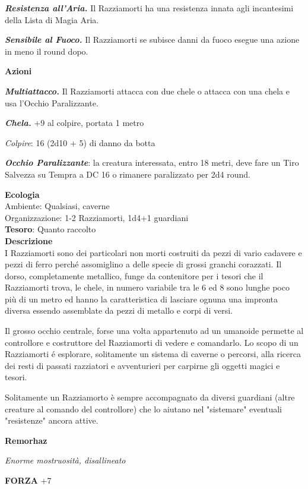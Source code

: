 \begin{multicols}{2}
	\textit{\textbf{Resistenza all'Aria.}} Il Razziamorti ha una resistenza innata agli incantesimi della Lista di Magia Aria.

	\textit{\textbf{Sensibile al Fuoco.}} Il Razziamorti se subisce danni da fuoco esegue una azione in meno il round dopo.

	\textbf{Azioni}

	\textit{\textbf{Multiattacco.}} Il Razziamorti attacca con due chele o attacca con una chela e usa l'Occhio Paralizzante.

	\textbf{\textit{Chela.}} +9 al colpire, portata 1 metro

	\textit{Colpire}: 16 (2d10 + 5) di danno da botta

	\textit{\textbf{Occhio Paralizzante}}: la creatura interessata, entro 18 metri, deve fare un Tiro Salvezza su Tempra a DC 16 o rimanere paralizzato per 2d4 round.

	\textbf{Ecologia}\\
	Ambiente: Qualsiasi, caverne\\
	Organizzazione: 1-2 Razziamorti, 1d4+1 guardiani\\
	\textbf{Tesoro}: Quanto raccolto\\
	\textbf{Descrizione}\\
	I Razziamorti sono dei particolari non morti costruiti da pezzi di vario cadavere e pezzi di ferro perché assomiglino a delle specie di grossi granchi corazzati.
	Il dorso, completamente metallico, funge da contenitore per i tesori che il Razziamorti trova, le chele, in numero variabile tra le 6 ed 8 sono lunghe poco più di un metro ed hanno la caratteristica di lasciare ognuna una impronta diversa essendo assemblate da pezzi di metallo e corpi di versi.

	Il grosso occhio centrale, forse una volta appartenuto ad un umanoide permette al controllore e costruttore del Razziamorti di vedere e comandarlo. Lo scopo di un Razziamorti é esplorare, solitamente un sistema di caverne o percorsi, alla ricerca dei resti di passati razziatori e avventurieri per carpirne gli oggetti magici e tesori.

	Solitamente un Razziamorto è sempre accompagnato da diversi guardiani (altre creature al comando del controllore) che lo aiutano nel "sistemare" eventuali "resistenze" ancora attive.


	\medskip{}\textbf{Remorhaz}

	\textit{Enorme mostruosità, disallineato}

	\textbf{FORZA} +7


\end{multicols}
